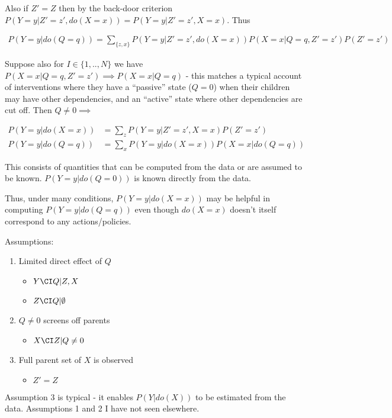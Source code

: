 Also if $Z'=Z$ then by the back-door criterion $P(Y=y|Z'=z',do(X=x))=P(Y=y|Z'=z',X=x)$. Thus

\begin{align}
    P(Y=y|do(Q=q)) = \sum_{\{z,x\}}P(Y=y|Z'=z',do(X=x)) P(X=x|Q=q,Z'=z') P(Z'=z')
\end{align}

Suppose also for $I\in\{1,..,N\}$ we have $P(X=x|Q=q,Z'=z')\implies P(X=x|Q=q)$ - this matches a typical account of interventions where they have a ``passive'' state ($Q=0$) when their children may have other dependencies, and an ``active'' state where other dependencies are cut off. Then $Q\neq 0\implies$

\begin{align}
    P(Y=y|do(X=x)) &= \sum_{z} P(Y=y|Z'=z',X=x) P(Z'=z') \\
    P(Y=y|do(Q=q)) &= \sum_{x} P(Y=y|do(X=x)) P(X=x|do(Q=q))
\end{align}

This consists of quantities that can be computed from the data or are assumed to be known. $P(Y=y|do(Q=0))$ is known directly from the data.

Thus, under many conditions, $P(Y=y|do(X=x))$ may be helpful in computing $P(Y=y|do(Q=q))$ even though $do(X=x)$ doesn't itself correspond to any actions/policies.

Assumptions:
\begin{enumerate}
    \item Limited direct effect of $Q$
    \begin{itemize}
        \item $Y\CI Q|Z,X$
        \item $Z\CI Q|\emptyset$
    \end{itemize}
    \item $Q\neq 0$ screens off parents
    \begin{itemize}
        \item $X\CI Z|Q\neq 0$
    \end{itemize}
    \item Full parent set of $X$ is observed
    \begin{itemize}
        \item $Z'=Z$
    \end{itemize}
\end{enumerate}

Assumption 3 is typical - it enables $P(Y|do(X))$ to be estimated from the data. Assumptions 1 and 2 I have not seen elsewhere.

